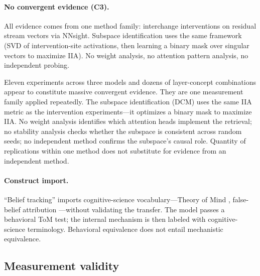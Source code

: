 \documentclass[11pt]{article}
\begin{document}
\paragraph{No convergent evidence (C3).}
All evidence comes from one method family: interchange interventions on residual stream vectors via NNsight. Subspace identification uses the same framework (SVD of intervention-site activations, then learning a binary mask over singular vectors to maximize IIA). No weight analysis, no attention pattern analysis, no independent probing.

Eleven experiments across three models and dozens of layer-concept combinations appear to constitute massive convergent evidence. They are one measurement family applied repeatedly. The subspace identification (DCM) uses the same IIA metric as the intervention experiments---it optimizes a binary mask to maximize IIA. No weight analysis identifies which attention heads implement the retrieval; no stability analysis checks whether the subspace is consistent across random seeds; no independent method confirms the subspace's causal role. Quantity of replications within one method does not substitute for evidence from an independent method.

\paragraph{Construct import.}
``Belief tracking'' imports cognitive-science vocabulary---Theory of Mind \citep{premack1978chimpanzee}, false-belief attribution \citep{wimmer1983beliefs}---without validating the transfer. The model passes a behavioral ToM test; the internal mechanism is then labeled with cognitive-science terminology. Behavioral equivalence does not entail mechanistic equivalence.

\subsection{Measurement validity}
\end{document}
